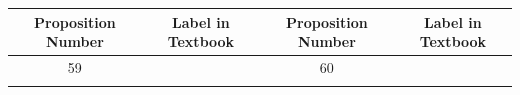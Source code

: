 \documentclass{book}
\newenvironment{allowTableDashes}{\ADLactivate}{\ADLinactivate}
\newcommand{\myVS}{\vphantom{$\int_a^b$}}
\begin{document}
\begin{allowTableDashes}
      \newpage

      \begin{tabular}{ c|c||c|c }
         Proposition Number & Label in Textbook & Proposition Number & Label in Textbook \\ \hline
         \myVS 59 &  & 60 &  \\ \hdashline[10pt/3pt]
      \end{tabular}

   \end{allowTableDashes}
\end{document}
